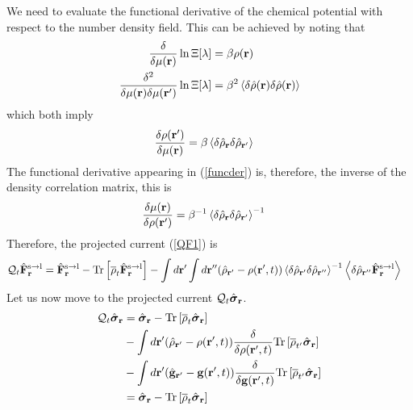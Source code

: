 \documentclass[b5paper,openright,11pt]{book}
\newcommand{\llangle}{\left\langle}
\newcommand{\rrangle}{\right\rangle}
\begin{document}
\begin{appendices}
We need to evaluate the functional derivative of the chemical potential with respect to the number density field. This can be achieved by noting that 
\begin{align}
  \frac{\delta}{\delta \mu({\bf r})}\ln \Xi[\lambda]&=\beta\rho({\bf r})
\nonumber\\
  \frac{\delta^2}{\delta \mu({\bf r})\delta \mu({\bf r}')}\ln \Xi[\lambda]&=
\beta^2\llangle \delta\hat{\rho}({\bf r})\delta\hat{\rho}({\bf r})\rrangle
\label{chi1}
\end{align}
which both imply
\begin{align}
  \frac{\delta \rho({\bf r}')  }{\delta \mu({\bf r})}&=\beta
\llangle \delta\hat{\rho}_{{\bf r}}\delta\hat{\rho}_{{\bf r}'}\rrangle
\label{chi2}
\end{align}
The functional derivative appearing in (\ref{funcder}) is, therefore, the inverse of the
density correlation matrix, this is
\begin{align}
  \frac{\delta \mu({\bf r})}{\delta \rho({\bf r}')  }&=\beta^{-1}
\llangle \delta\hat{\rho}_{{\bf r}}\delta\hat{\rho}_{{\bf r}'}\rrangle^{-1}
\label{chi3}
\end{align}
Therefore, the projected current (\ref{QF1}) is
\begin{align}
  {\cal Q}_t\hat{\bf F}^{\rm s\to l}_{{\bf r}}&=
\hat{\bf F}^{\rm s\to l}_{{\bf r}}- {\rm Tr}\left[\overline{\rho}_{t} \hat{\bf F}^{\rm s\to l}_{{\bf r}}\right]
-\int d{\bf r}'\int d{\bf r}''(\hat{\rho}_{{\bf r}'}-{\rho}({\bf r}',t))
\llangle \delta\hat{\rho}_{{\bf r}'}\delta\hat{\rho}_{{\bf r}''}\rrangle^{-1}
\llangle \delta \hat{\rho}_{{\bf r}''}\hat{\bf F}^{\rm s\to l}_{{\bf r}}\rrangle\label{QF1b}
\end{align}
Let us now move to the projected current ${\cal Q}_t\hat{\boldsymbol{\sigma}}_{\bf r}$. 
\begin{align}
  {\cal Q}_t\hat{\boldsymbol{\sigma}}_{{\bf r}}&=
\hat{\boldsymbol{\sigma}}_{{\bf r}}- {\rm Tr}\left[\overline{\rho}_{t} \hat{\boldsymbol{\sigma}}_{{\bf r}}\right]
\nonumber\\
&-\int d{\bf r}'(\hat{\rho}_{{\bf r}'}-\rho({\bf r}',t))
\frac{\delta}{\delta \rho({\bf r}',t)}{\rm Tr}\left[\overline{\rho}_{t'}\hat{\boldsymbol{\sigma}}_{{\bf r}}\right]
\nonumber\\
&-\int d{\bf r}'(\hat{\bf g}_{{\bf r}'}-{\bf g}({\bf r}',t))
\frac{\delta}{\delta {\bf g}({\bf r}',t)}{\rm Tr}\left[\overline{\rho}_{t'}  \hat{\boldsymbol{\sigma}}_{{\bf r}}\right]
\nonumber\\
&=\hat{\boldsymbol{\sigma}}_{{\bf r}}- {\rm Tr}\left[\overline{\rho}_{t} \hat{\boldsymbol{\sigma}}_{{\bf r}}\right]

\end{align}
\end{appendices}
\end{document}
